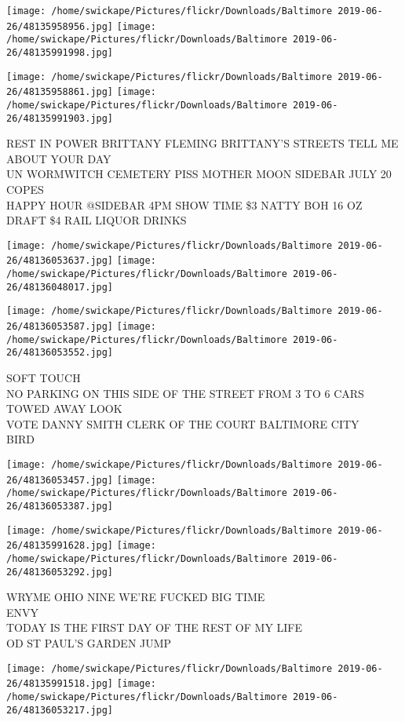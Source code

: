 \documentclass[10pt,letterpaper]{article}
\begin{document}
\texttt{[image: /home/swickape/Pictures/flickr/Downloads/Baltimore 2019-06-26/48135958956.jpg]}
\texttt{[image: /home/swickape/Pictures/flickr/Downloads/Baltimore 2019-06-26/48135991998.jpg]}

\texttt{[image: /home/swickape/Pictures/flickr/Downloads/Baltimore 2019-06-26/48135958861.jpg]}
\texttt{[image: /home/swickape/Pictures/flickr/Downloads/Baltimore 2019-06-26/48135991903.jpg]}

REST IN POWER BRITTANY FLEMING BRITTANY'S STREETS TELL ME ABOUT YOUR DAY\\
UN WORMWITCH CEMETERY PISS MOTHER MOON SIDEBAR JULY 20\\
COPES\\
HAPPY HOUR @SIDEBAR 4PM SHOW TIME \$3 NATTY BOH 16 OZ DRAFT \$4 RAIL LIQUOR DRINKS
\pagebreak

\texttt{[image: /home/swickape/Pictures/flickr/Downloads/Baltimore 2019-06-26/48136053637.jpg]}
\texttt{[image: /home/swickape/Pictures/flickr/Downloads/Baltimore 2019-06-26/48136048017.jpg]}

\texttt{[image: /home/swickape/Pictures/flickr/Downloads/Baltimore 2019-06-26/48136053587.jpg]}
\texttt{[image: /home/swickape/Pictures/flickr/Downloads/Baltimore 2019-06-26/48136053552.jpg]}

SOFT TOUCH\\
NO PARKING ON THIS SIDE OF THE STREET FROM 3 TO 6 CARS TOWED AWAY LOOK\\
VOTE DANNY SMITH CLERK OF THE COURT BALTIMORE CITY\\
BIRD
\pagebreak

\texttt{[image: /home/swickape/Pictures/flickr/Downloads/Baltimore 2019-06-26/48136053457.jpg]}
\texttt{[image: /home/swickape/Pictures/flickr/Downloads/Baltimore 2019-06-26/48136053387.jpg]}

\texttt{[image: /home/swickape/Pictures/flickr/Downloads/Baltimore 2019-06-26/48135991628.jpg]}
\texttt{[image: /home/swickape/Pictures/flickr/Downloads/Baltimore 2019-06-26/48136053292.jpg]}

WRYME OHIO NINE WE'RE FUCKED BIG TIME\\
ENVY\\
TODAY IS THE FIRST DAY OF THE REST OF MY LIFE\\
OD ST PAUL'S GARDEN JUMP
\pagebreak

\texttt{[image: /home/swickape/Pictures/flickr/Downloads/Baltimore 2019-06-26/48135991518.jpg]}
\texttt{[image: /home/swickape/Pictures/flickr/Downloads/Baltimore 2019-06-26/48136053217.jpg]}
\end{document}
